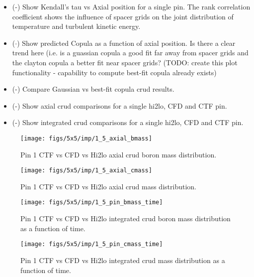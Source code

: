 \begin{itemize}
    \item (\checkmark-) Show Kendall's tau vs Axial position for a single pin.  The rank correlation coefficient shows
    the influence of spacer grids on the joint distribution of temperature and turbulent kinetic energy.
    \item ($\cdot$) Show predicted Copula as a function of axial position.  Is there a clear trend here (i.e. is a guassian copula
    a good fit far away from spacer grids and the clayton copula a better fit near spacer grids?  (TODO: create this plot functionality - capability to compute best-fit copula already exists)
    \item (\checkmark-) Compare Gaussian vs best-fit copula crud results.
    \item (\checkmark-) Show axial crud comparisons for a single hi2lo, CFD and CTF pin.
    \item (\checkmark-) Show integrated crud comparisons for a single hi2lo, CFD and CTF pin.
\end{itemize}

\begin{figure}[H]
    \centering
    \texttt{[image: figs/5x5/imp/1\_5\_axial\_bmass]}
    \caption{Pin 1 CTF vs CFD vs Hi2lo axial crud boron mass distribution.}
    \label{fig:15axialbmass}
\end{figure}
\begin{figure}[H]
    \centering
    \texttt{[image: figs/5x5/imp/1\_5\_axial\_cmass]}
    \caption{Pin 1 CTF vs CFD vs Hi2lo axial crud mass distribution.}
    \label{fig:15axialcmass}
\end{figure}
\begin{figure}[H]
    \centering
    \texttt{[image: figs/5x5/imp/1\_5\_pin\_bmass\_time]}
    \caption{Pin 1 CTF vs CFD vs Hi2lo integrated crud boron mass distribution as a function of time.}
    \label{fig:15pinbmasstime}
\end{figure}
\begin{figure}[H]
    \centering
    \texttt{[image: figs/5x5/imp/1\_5\_pin\_cmass\_time]}
    \caption{Pin 1 CTF vs CFD vs Hi2lo integrated crud mass distribution as a function of time.}
    \label{fig:15pincmasstime}
\end{figure}

